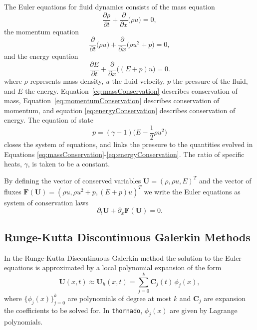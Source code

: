 \documentclass[10pt,preprint]{aastex}
\newcommand{\thornado}{\texttt{thornado}}
\begin{document}
The Euler equations for fluid dynamics \citep[see, e.g.,][for details]{Leveque2002} consists of the mass equation
\begin{equation}
  \frac{\partial \rho}{\partial t}  
  + \frac{\partial}{\partial x} \Big(\rho u\Big) = 0,
  \label{eq:massConservation}
\end{equation}
the momentum equation
\begin{equation}
  \frac{\partial}{\partial t} \Big(\rho u\Big)
  + \frac{\partial}{\partial x} \Big(\rho u^2 + p\Big) = 0,
  \label{eq:momentumConservation}
\end{equation}
and the energy equation
\begin{equation}
  \frac{\partial E}{\partial t}
  + \frac{\partial}{\partial x} \Big((E + p) u\Big) = 0.  
  \label{eq:energyConservation}
\end{equation}
where $\rho$ represents mass density, $u$ the fluid velocity, $p$ the pressure of the fluid, and $E$ the energy.  
Equation~\eqref{eq:massConservation} describes conservation of mass, Equation~\eqref{eq:momentumConservation} describes conservation of momentum, and equation \eqref{eq:energyConservation} describes conservation of energy.
The equation of state
\begin{equation}
  p = (\gamma - 1)
  \Big(E - \frac{1}{2} \rho u^2 \Big)
  \label{eq:eos}
\end{equation}
closes the system of equations, and links the pressure to the quantities evolved in Equations \eqref{eq:massConservation}-\eqref{eq:energyConservation}. 
The ratio of specific heats, $\gamma$, is taken to be a constant.  

By defining the vector of conserved variables $\boldsymbol{U}=(\rho,\rho u,E)^{T}$ and the vector of fluxes $\boldsymbol{F}(\boldsymbol{U})=(\rho u,\rho u^{2}+p,(E+p)u)^{T}$ we write the Euler equations as system of conservation laws
\begin{equation}
  \partial_{t}\boldsymbol{U}
  +\partial_{x}\boldsymbol{F}(\boldsymbol{U})
  =0.
\end{equation}

\subsection{Runge-Kutta Discontinuous Galerkin Methods}

In the Runge-Kutta Discontinuous Galerkin \citep[RKDG; cf.][]{cockburnShu_2001} method the solution to the Euler equations is approximated by a local polynomial expansion of the form
\begin{equation}
  \boldsymbol{U}(x,t)
  \approx\boldsymbol{U}_{h}(x,t)=\sum_{j=0}^{k}\boldsymbol{C}_{j}(t)\,\phi_{j}(x),
\end{equation}
where $\{\phi_{j}(x)\}_{j=0}^{k}$ are polynomials of degree at most $k$ and $\boldsymbol{C}_{j}$ are expansion the coefficients to be solved for.  
In \thornado, $\phi_{j}(x)$ are given by Lagrange polynomials.  
\end{document}
